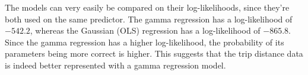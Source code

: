 \documentclass[11pt]{article}
\begin{document}
The models can very easily be compared on their log-likelihoods, since they're both used on the same predictor.
The gamma regression has a log-likelihood of $-542.2$, whereas the Gaussian (OLS) regression has a log-likelihood of $-865.8$.
Since the gamma regression has a higher log-likelihood, the probability of its parameters being more correct
is higher. This suggests that the trip distance data is indeed better represented with a gamma regression model.





\end{document}

